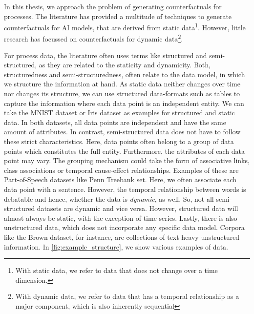 \documentclass[./../../paper.tex]{subfiles}
\begin{document}
In this thesis, we approach the problem of generating counterfactuals for processes. The literature has provided a multitude of techniques to generate counterfactuals for AI models, that are derived from static data\footnote{With static data, we refer to data that does not change over a time dimension.}. However, little research has focussed on counterfactuals for dynamic data\footnote{With dynamic data, we refer to data that has a temporal relationship as a major component, which is also inherently sequential}.  

For process data, the literature often uses terms like structured and semi-structured, as they are related to the staticity and dynamicity. Both, structuredness and semi-structuredness, often relate to the data model, in which we structure the information at hand. 
As static data neither changes over time nor changes its structure, we can use structured data-formats such as tables to capture the information where each data point is an independent entity. We can take the MNIST dataset\cite{deng_MNISTDatabaseHandwritten_2012} or Iris dataset\cite{anderson_SpeciesProblemIris_1936,fisher_UseMultipleMeasurements_1936} as examples for structured and static data. 
In both datasets, all data points are independent and have the same amount of attributes. In contrast, semi-structured data does not have to follow these strict characteristics. Here, data points often belong to a group of data points which constitutes the full entity. Furthermore, the attributes of each data point may vary. The grouping mechanism could take the form of associative links, class associations or temporal cause-effect relationships. Examples of these are Part-of-Speech datasets like Penn Treebank set\cite{marcus_Buildinglargeannotated_1993}. 
Here, we often associate each data point with a sentence. However, the temporal relationship between words is debatable and hence, whether the data is \emph{dynamic}, as well. So, not all semi-structured datasets are dynamic and vice versa. However, structured data will almost always be static, with the exception of time-series. 
Lastly, there is also unstructured data, which does not incorporate any specific data model. Corpora like the Brown dataset\cite{francis79browncorpus}, for instance, are collections of text heavy unstructured information. In \autoref{fig:example_structure}, we show various examples of data.
\end{document}
